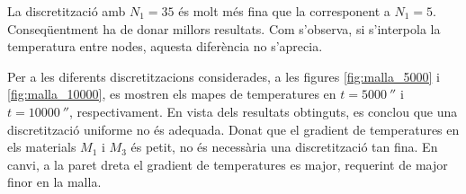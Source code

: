 \noindent
La discretització amb $N_1 = 35$ és molt més fina que la corresponent a $N_1 = 5$. Conseqüentment ha de donar millors resultats. Com s'observa, si s'interpola la temperatura entre nodes, aquesta diferència no s'aprecia.

Per a les diferents discretitzacions considerades, a les figures \ref{fig:malla_5000} i \ref{fig:malla_10000}, es mostren els mapes de temperatures en $t = 5000 \ \second$ i $t = 10000 \ \second$, respectivament. En vista dels resultats obtinguts, es conclou que una discretització uniforme no és adequada. Donat que el gradient de temperatures en els materials $M_1$ i $M_3$ és petit, no és necessària una discretització tan fina. En canvi, a la paret dreta el gradient de temperatures es major, requerint de major finor en la malla.


